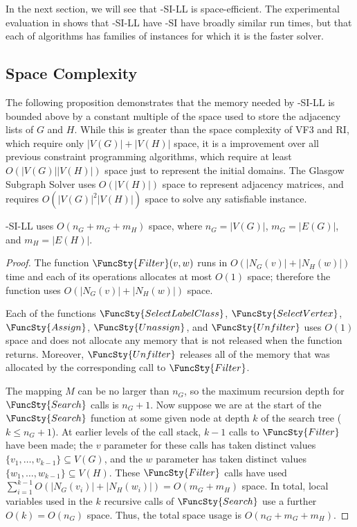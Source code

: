 In the next section, we will see that \McSplit-SI-LL is space-efficient.  The experimental evaluation
in  shows that \McSplit-SI-LL have \McSplit-SI have broadly
similar run times, but that each of algorithms has families of instances for which it is the faster
solver.

\subsection{Space Complexity}\label{sec:mcsplit-si-space-complexity}

The following proposition demonstrates that the memory needed by \McSplit-SI-LL
is bounded above by a constant multiple of the space used to store the adjacency
lists of $G$ and $H$.  While this is greater than the space complexity of 
VF3 and RI, which require only $|V(G)| + |V(H)|$ space, it is a improvement
over all previous constraint programming algorithms, which
require at least $O(|V(G)| |V(H)|)$ space just to represent
the initial domains.  The Glasgow Subgraph Solver uses $O(|V(H)|)$ space
to represent adjacency matrices, and requires $O(|V(G)|^2|V(H)|)$ space
to solve any satisfiable instance.

\begin{proposition}\label{mcsplit-si-space}
    \McSplit-SI-LL uses $O(n_G + m_G + m_H)$ space, where
    $n_G=|V(G)|$,
    $m_G=|E(G)|$, and
    $m_H=|E(H)|$.
\end{proposition}

\begin{proof}
    The function $\FuncSty{Filter}(v,w)$ runs in $O(|N_G(v)| + |N_H(w)|)$ time
    and each of its operations allocates at most $O(1)$ space; therefore the
    function uses $O(|N_G(v)| + |N_H(w)|)$ space.

    Each of the functions
    $\FuncSty{SelectLabelClass}$,
    $\FuncSty{SelectVertex}$,
    $\FuncSty{Assign}$,
    $\FuncSty{Unassign}$,
    and
    $\FuncSty{Unfilter}$
    uses $O(1)$ space and does not allocate any memory that is not released
    when the function returns.  Moreover, $\FuncSty{Unfilter}$ releases
    all of the memory that was allocated by the corresponding call to $\FuncSty{Filter}$.

    The mapping $M$ can be no larger than $n_G$, so the maximum recursion depth for
    $\FuncSty{Search}$ calls is $n_G + 1$.  Now suppose we are at the start of the
    $\FuncSty{Search}$ function at some given node at depth $k$ of the search tree 
    ($k \leq n_G + 1$).  At earlier levels of the call stack, $k-1$ calls to $\FuncSty{Filter}$
    have been made; the $v$ parameter for these calls has taken distinct values
    $\{v_1, \dots, v_{k-1}\} \subseteq V(G)$, and the $w$ parameter has taken distinct values
    $\{w_1, \dots, w_{k-1}\} \subseteq V(H)$.  These $\FuncSty{Filter}$ calls have used
    $\sum_{i=1}^{k-1} O(|N_G(v_i)| + |N_H(w_i)|) = O(m_G + m_H)$ space.  In total,
    local variables used in the $k$
    recursive calls of $\FuncSty{Search}$ use a further $O(k) = O(n_G)$ space.  Thus,
    the total space usage is $O(n_G + m_G + m_H)$.
\end{proof}

